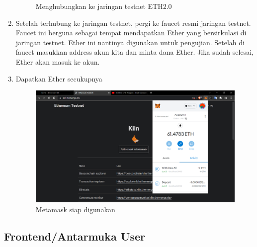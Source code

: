 \begin{enumerate}
\begin{figure}[htp]
		\caption{Menghubungkan ke jaringan testnet ETH2.0}
		\label{fig:connect2testnet}
	\end{figure}
\item{Setelah terhubung ke jaringan testnet, pergi ke faucet resmi jaringan testnet. Faucet ini berguna sebagai tempat mendapatkan Ether yang bersirkulasi di jaringan testnet. Ether ini nantinya digunakan untuk pengujian. Setelah di faucet masukkan address akun kita dan minta dana Ether. Jika sudah selesai, Ether akan masuk ke akun.}
\item{Dapatkan Ether secukupnya}
	\begin{figure}[htp]
		\centering
		\includegraphics[scale=0.2]{gambar/bab3/metamask/6.png}
		\caption{Metamask siap digunakan}
		\label{fig:accready}
	\end{figure}
\end{enumerate}

\subsection{Frontend/Antarmuka User}
\label{subsec:frontenduser}

